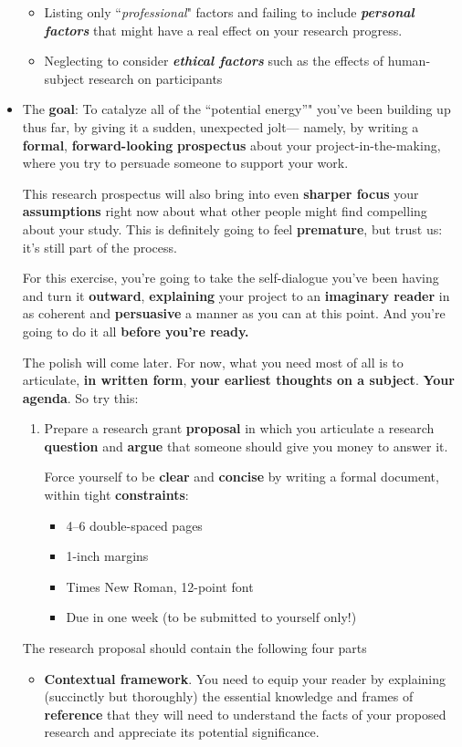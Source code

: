 \documentclass[11pt]{article}
\begin{document}
\begin{itemize}
\begin{itemize}
\item Listing only ``\emph{professional}" factors and failing to include \emph{\textbf{personal factors}} that might have a real effect on your research progress.

\item Neglecting to consider \emph{\textbf{ethical factors}} such as the effects of human-subject research on participants
\end{itemize}

\vspace{20pt}
\item \begin{exercise}

The \textbf{goal}: To catalyze all of the ``potential energy”" you’ve been building up thus far, by giving it a sudden, unexpected jolt— namely, by writing a \textbf{formal}, \textbf{forward-looking} \textbf{prospectus} about your project-in-the-making, where you try to persuade someone to support your work. 

This research prospectus will also bring into even \textbf{sharper focus} your \textbf{assumptions} right now about what other people might find compelling about your study. This is definitely going to feel \textbf{premature}, but trust us: it’s still part of the process.

 For this exercise, you’re going to take the self-dialogue you’ve been having and turn it \textbf{outward}, \textbf{explaining} your project to an \textbf{imaginary reader} in as coherent and \textbf{persuasive} a manner as you can at this point.  And you’re going to do it all \textbf{before you’re ready.} 
 
The polish will come later. For now, what you need most of all is to articulate, \textbf{in written form}, \textbf{your earliest thoughts on a subject}. \textbf{Your agenda}. So try this: 
\begin{enumerate}
\item Prepare a research grant \textbf{proposal} in which you articulate a research \textbf{question} and \textbf{argue} that someone should give you money to answer it. 

Force yourself to be \textbf{clear} and \textbf{concise} by writing a formal document, within tight \textbf{constraints}:
\begin{itemize}
\item 4–6 double-spaced pages
\item 1-inch margins
\item Times New Roman, 12-point font
\item Due in one week (to be submitted to yourself only!)
\end{itemize}
\end{enumerate}
The research proposal should contain the following four parts
\begin{itemize}
\item \textbf{Contextual framework}. You need to equip your reader by explaining (succinctly but thoroughly) the essential knowledge and frames of \textbf{reference} that they will need to understand the facts of your proposed research and appreciate its potential significance.


\end{itemize}
\end{exercise}
\end{itemize}
\end{document}

